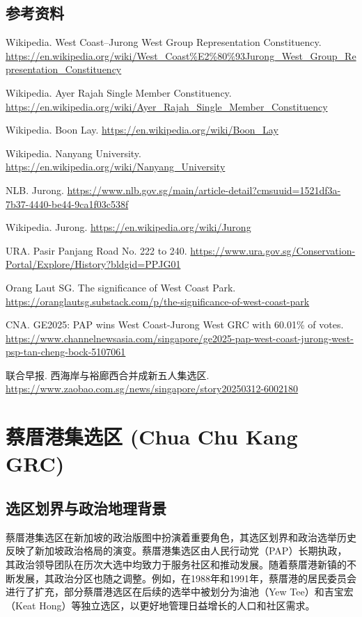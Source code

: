 \documentclass[11pt,a4paper,twoside,openany]{book}
\begin{document}
\section*{参考资料}
\begin{enumerate}[label={[\arabic*]},leftmargin=*,topsep=2pt,itemsep=1pt,parsep=0pt]
  \item Wikipedia. West Coast–Jurong West Group Representation Constituency. \url{https://en.wikipedia.org/wiki/West_Coast%E2%80%93Jurong_West_Group_Representation_Constituency}
  \item Wikipedia. Ayer Rajah Single Member Constituency. \url{https://en.wikipedia.org/wiki/Ayer_Rajah_Single_Member_Constituency}
  \item Wikipedia. Boon Lay. \url{https://en.wikipedia.org/wiki/Boon_Lay}
  \item Wikipedia. Nanyang University. \url{https://en.wikipedia.org/wiki/Nanyang_University}
  \item NLB. Jurong. \url{https://www.nlb.gov.sg/main/article-detail?cmsuuid=1521df3a-7b37-4440-be44-9ca1f03c538f}
  \item Wikipedia. Jurong. \url{https://en.wikipedia.org/wiki/Jurong}
  \item URA. Pasir Panjang Road No. 222 to 240. \url{https://www.ura.gov.sg/Conservation-Portal/Explore/History?bldgid=PPJG01}
  \item Orang Laut SG. The significance of West Coast Park. \url{https://oranglautsg.substack.com/p/the-significance-of-west-coast-park}
  \item CNA. GE2025: PAP wins West Coast-Jurong West GRC with 60.01\% of votes. \url{https://www.channelnewsasia.com/singapore/ge2025-pap-west-coast-jurong-west-psp-tan-cheng-bock-5107061}
  \item 联合早报. 西海岸与裕廊西合并成新五人集选区. \url{https://www.zaobao.com.sg/news/singapore/story20250312-6002180}
\end{enumerate}

\chapter{蔡厝港集选区 (Chua Chu Kang GRC)}

\section{选区划界与政治地理背景}
蔡厝港集选区在新加坡的政治版图中扮演着重要角色，其选区划界和政治选举历史反映了新加坡政治格局的演变。蔡厝港集选区由人民行动党（PAP）长期执政，其政治领导团队在历次大选中均致力于服务社区和推动发展。随着蔡厝港新镇的不断发展，其政治分区也随之调整。例如，在1988年和1991年，蔡厝港的居民委员会进行了扩充，部分蔡厝港选区在后续的选举中被划分为油池（Yew Tee）和吉宝宏（Keat Hong）等独立选区，以更好地管理日益增长的人口和社区需求。
\end{document}
